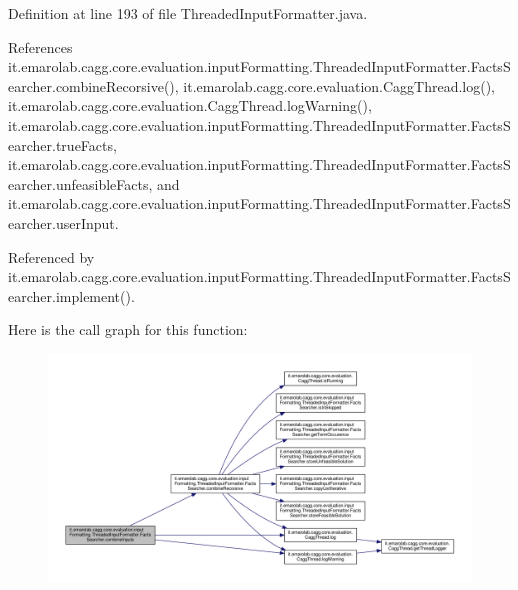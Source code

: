 Definition at line 193 of file Threaded\-Input\-Formatter.\-java.



References it.\-emarolab.\-cagg.\-core.\-evaluation.\-input\-Formatting.\-Threaded\-Input\-Formatter.\-Facts\-Searcher.\-combine\-Recorsive(), it.\-emarolab.\-cagg.\-core.\-evaluation.\-Cagg\-Thread.\-log(), it.\-emarolab.\-cagg.\-core.\-evaluation.\-Cagg\-Thread.\-log\-Warning(), it.\-emarolab.\-cagg.\-core.\-evaluation.\-input\-Formatting.\-Threaded\-Input\-Formatter.\-Facts\-Searcher.\-true\-Facts, it.\-emarolab.\-cagg.\-core.\-evaluation.\-input\-Formatting.\-Threaded\-Input\-Formatter.\-Facts\-Searcher.\-unfeasible\-Facts, and it.\-emarolab.\-cagg.\-core.\-evaluation.\-input\-Formatting.\-Threaded\-Input\-Formatter.\-Facts\-Searcher.\-user\-Input.



Referenced by it.\-emarolab.\-cagg.\-core.\-evaluation.\-input\-Formatting.\-Threaded\-Input\-Formatter.\-Facts\-Searcher.\-implement().



Here is the call graph for this function\-:\nopagebreak
\begin{figure}[H]
\begin{center}
\leavevmode
\includegraphics[width=350pt]{classit_1_1emarolab_1_1cagg_1_1core_1_1evaluation_1_1inputFormatting_1_1ThreadedInputFormatter_1_1FactsSearcher_a35d336157eee26c5523fbc4b55a63b20_cgraph}
\end{center}
\end{figure}


